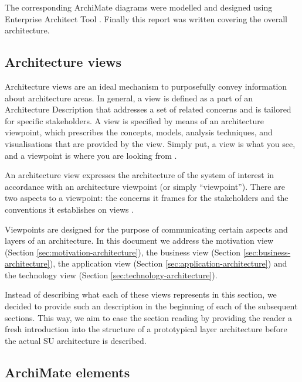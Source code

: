 	 The corresponding ArchiMate diagrams were modelled and designed using Enterprise Architect Tool \citep{ea}. Finally this report was written covering the overall architecture. 
	
	\subsection{Architecture views}
	\label{sec:views}
	
	
	Architecture views are an ideal mechanism to purposefully convey information about architecture areas. In general, a view is defined as a part of an Architecture Description that addresses a set of related concerns and is tailored for specific stakeholders. A view is specified by means of an architecture viewpoint, which prescribes the concepts, models, analysis techniques, and visualisations that are provided by the view. Simply put, a view is what you see, and a viewpoint is where you are looking from \citep{archimate3.1}.
	
	An architecture view expresses the architecture of the system of interest in accordance with an architecture viewpoint (or simply ``viewpoint''). There are two aspects to a viewpoint: the concerns it frames for the stakeholders and the conventions it establishes on views \citep{archimate3.1}.

	Viewpoints are designed for the purpose of communicating certain aspects and layers of an architecture. In this document we address the motivation view (Section \ref{sec:motivation-architecture}), the business view (Section \ref{sec:business-architecture}), the application view (Section \ref{sec:application-architecture}) and the technology view (Section \ref{sec:technology-architecture}).
	
	Instead of describing what each of these views represents in this section, we decided to provide such an description in the beginning of each of the subsequent sections. This way, we aim to ease the section reading by providing the reader a fresh introduction into the structure of a prototypical layer architecture before the actual SU architecture is described.
	
	\subsection{ArchiMate elements}
	

